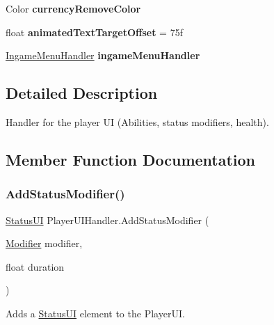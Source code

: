\begin{DoxyCompactItemize}
\hypertarget{class_player_u_i_handler_a9aa2ea066c755fc2329f62bae6656ee3}{}\label{class_player_u_i_handler_a9aa2ea066c755fc2329f62bae6656ee3} 
Color {\bfseries currency\+Remove\+Color}
\item 
\hypertarget{class_player_u_i_handler_af4aa2997a916f774ca111a96bfea79c0}{}\label{class_player_u_i_handler_af4aa2997a916f774ca111a96bfea79c0} 
float {\bfseries animated\+Text\+Target\+Offset} = 75f
\item 
\hypertarget{class_player_u_i_handler_a14e8ec7ef539894842681c1831566c1f}{}\label{class_player_u_i_handler_a14e8ec7ef539894842681c1831566c1f} 
\hyperlink{class_ingame_menu_handler}{Ingame\+Menu\+Handler} {\bfseries ingame\+Menu\+Handler}
\end{DoxyCompactItemize}


\subsection{Detailed Description}
Handler for the player UI (Abilities, status modifiers, health). 



\subsection{Member Function Documentation}
\hypertarget{class_player_u_i_handler_a76e0a2223390a5578cd6c885f8ff9e1c}{}\label{class_player_u_i_handler_a76e0a2223390a5578cd6c885f8ff9e1c} 
\subsubsection{\texorpdfstring{Add\+Status\+Modifier()}{AddStatusModifier()}}
{\footnotesize\ttfamily \hyperlink{class_status_u_i}{Status\+UI} Player\+U\+I\+Handler.\+Add\+Status\+Modifier (\begin{DoxyParamCaption}\item[{\hyperlink{class_modifier}{Modifier}}]{modifier,  }\item[{float}]{duration }\end{DoxyParamCaption})}



Adds a \hyperlink{class_status_u_i}{Status\+UI} element to the Player\+UI. 


